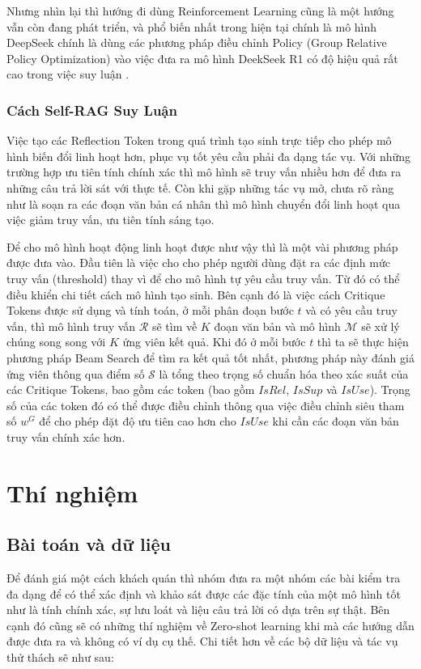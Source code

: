 \documentclass{article}
\begin{document}
Nhưng nhìn lại thì hướng đi dùng Reinforcement Learning cũng là một hướng vẫn còn đang phát triển, và phổ biến nhất trong hiện tại chính là mô hình DeepSeek chính là dùng các phương pháp điều chỉnh Policy (Group Relative Policy Optimization) vào việc đưa ra mô hình DeekSeek R1 có độ hiệu quả rất cao trong việc suy luận \cite{guo2025deepseek}. 

\subsubsection{Cách Self-RAG Suy Luận}
Việc tạo các Reflection Token trong quá trình tạo sinh trực tiếp cho phép mô hình biến đổi linh hoạt hơn, phục vụ tốt yêu cầu phải đa dạng tác vụ. Với những trường hợp ưu tiên tính chính xác thì mô hình sẽ truy vấn nhiều hơn để đưa ra những câu trả lời sát với thực tế. Còn khi gặp những tác vụ mở, chưa rõ ràng như là soạn ra các đoạn văn bản cá nhân thì mô hình chuyển đổi linh hoạt qua việc giảm truy vấn, ưu tiên tính sáng tạo. 

Để cho mô hình hoạt động linh hoạt được như vậy thì là một vài phương pháp được đưa vào. Đầu tiên là việc cho cho phép người dùng đặt ra các định mức truy vấn (threshold) thay vì để cho mô hình tự yêu cầu truy vấn. Từ đó có thể điều khiển chi tiết cách mô hình tạo sinh. Bên cạnh đó là việc cách Critique Tokens được sử dụng và tính toán, ở mỗi phân đoạn bước $t$ và có yêu cầu truy vấn, thì mô hình truy vấn $\mathcal{R}$ sẽ tìm về $K$ đoạn văn bản và mô hình $\mathcal{M}$ sẽ xử lý chúng song song với $K$ ứng viên kết quả. Khi đó ở mỗi bước $t$ thì ta sẽ thực hiện phương pháp Beam Search để tìm ra kết quả tốt nhất, phương pháp này đánh giá ứng viên thông qua điểm số $\mathcal{S}$ là tổng theo trọng số chuẩn hóa theo xác suất của các Critique Tokens, bao gồm các token (bao gồm $IsRel$, $IsSup$ và $IsUse$). Trọng số của các token đó có thể được điều chỉnh thông qua việc điều chỉnh siêu tham số $w^G$ để cho phép đặt độ ưu tiên cao hơn cho $IsUse$ khi cần các đoạn văn bản truy vấn chính xác hơn. 

\section{Thí nghiệm}

\subsection{Bài toán và dữ liệu}
Để đánh giá một cách khách quán thì nhóm đưa ra một nhóm các bài kiểm tra đa dạng để có thể xác định và khảo sát được các đặc tính của một mô hình tốt như là tính chính xác, sự lưu loát và liệu câu trả lời có dựa trên sự thật. Bên cạnh đó cũng sẽ có những thí nghiệm về Zero-shot learning khi mà các hướng dẫn được đưa ra và không có ví dụ cụ thế. Chi tiết hơn về các bộ dữ liệu và tác vụ thử thách sẽ như sau: 
\end{document}
